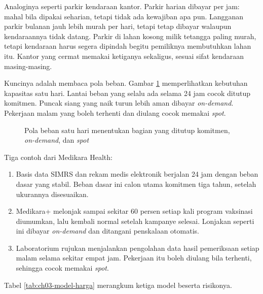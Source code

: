 Analoginya seperti parkir kendaraan kantor. Parkir harian dibayar per jam: mahal bila dipakai
seharian, tetapi tidak ada kewajiban apa pun. Langganan parkir bulanan jauh lebih murah per hari,
tetapi tetap dibayar walaupun kendaraannya tidak datang. Parkir di lahan kosong milik tetangga
paling murah, tetapi kendaraan harus segera dipindah begitu pemiliknya membutuhkan lahan itu. Kantor
yang cermat memakai ketiganya sekaligus, sesuai sifat kendaraan masing-masing.

Kuncinya adalah membaca pola beban. Gambar \ref{fig:ch03-pola-beban} memperlihatkan kebutuhan
kapasitas satu hari. Lantai beban yang selalu ada selama 24 jam cocok ditutup komitmen. Puncak siang
yang naik turun lebih aman dibayar \textit{on-demand}. Pekerjaan malam yang boleh terhenti dan
diulang cocok memakai \textit{spot}.

\begin{figure}[!htb]
  \centering
  
  \caption{Pola beban satu hari menentukan bagian yang ditutup komitmen,
           \textit{on-demand}, dan \textit{spot}}
  \label{fig:ch03-pola-beban}
\end{figure}

Tiga contoh dari Medikara Health:
\begin{enumerate}
  \item Basis data SIMRS dan rekam medis elektronik berjalan 24 jam dengan beban dasar yang stabil.
        Beban dasar ini calon utama komitmen tiga tahun, setelah ukurannya disesuaikan.
  \item Medikara+ melonjak sampai sekitar 60 persen setiap kali program vaksinasi diumumkan, lalu
        kembali normal setelah kampanye selesai. Lonjakan seperti ini dibayar \textit{on-demand} dan
        ditangani penskalaan otomatis.
  \item Laboratorium rujukan menjalankan pengolahan data hasil pemeriksaan setiap malam selama
        sekitar empat jam. Pekerjaan itu boleh diulang bila terhenti, sehingga cocok memakai
        \textit{spot}.
\end{enumerate}

Tabel \ref{tab:ch03-model-harga} merangkum ketiga model beserta risikonya.

